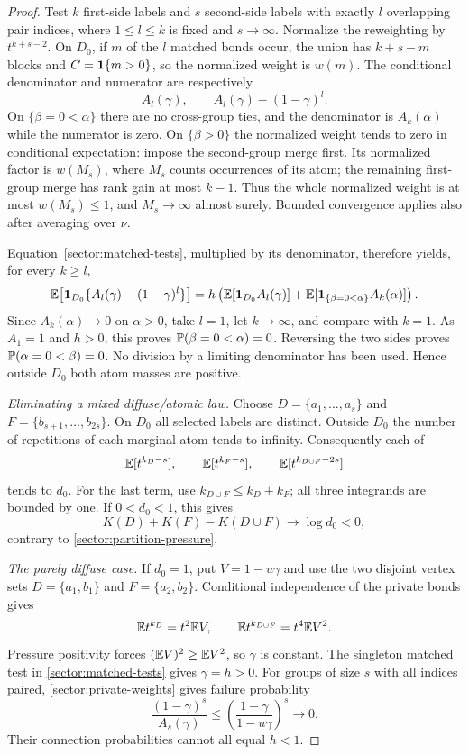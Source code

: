\begin{proof}
Test $k$ first-side labels and $s$ second-side labels with exactly
$l$ overlapping pair indices, where $1\leq l\leq k$ is fixed and
$s\to\infty$.  Normalize the reweighting by $t^{k+s-2}$.
On $D_0$, if $m$ of the $l$ matched bonds occur, the union has
$k+s-m$ blocks and $C=\mathbf 1\{m>0\}$, so the normalized weight is
$w(m)$.  The conditional denominator and numerator are respectively
\begin{equation}\label{sector:private-weights}
 A_l(\gamma),\qquad A_l(\gamma)-(1-\gamma)^l.
\end{equation}
On $\{\beta=0<\alpha\}$ there are no cross-group ties, and the
denominator is $A_k(\alpha)$ while the numerator is zero.
On $\{\beta>0\}$ the normalized weight tends to zero in conditional
expectation: impose the second-group merge first.  Its normalized
factor is $w(M_s)$, where $M_s$ counts occurrences of its atom; the
remaining first-group merge has rank gain at most $k-1$.
Thus the whole normalized weight is at most $w(M_s)\leq1$, and
$M_s\to\infty$ almost surely.  Bounded convergence applies also
after averaging over $\nu$.

Equation~\eqref{sector:matched-tests}, multiplied by its denominator,
therefore yields, for every $k\geq l$,
\begin{equation}\label{sector:half-atomic-equation}
 \mathbb E\bigl[\mathbf 1_{D_0}\{A_l(\gamma)-(1-\gamma)^l\}\bigr]
 =h\left(\mathbb E[\mathbf 1_{D_0}A_l(\gamma)]
          +\mathbb E[\mathbf 1_{\{\beta=0<\alpha\}}A_k(\alpha)]\right).
\end{equation}
Since $A_k(\alpha)\to0$ on $\alpha>0$, take $l=1$, let $k\to\infty$,
and compare with $k=1$.  As $A_1=1$ and $h>0$, this proves
$\mathbb P(\beta=0<\alpha)=0$.  Reversing the two sides proves
$\mathbb P(\alpha=0<\beta)=0$.  No division by a limiting denominator has
been used.  Hence outside $D_0$ both atom masses are positive.

\emph{Eliminating a mixed diffuse/atomic law.}
Choose $D=\{a_1,\ldots,a_s\}$ and
$F=\{b_{s+1},\ldots,b_{2s}\}$.  On $D_0$ all selected labels are
distinct.  Outside $D_0$ the number of repetitions of each marginal
atom tends to infinity.  Consequently each of
\[
 \mathbb E[t^{k_D-s}],\qquad \mathbb E[t^{k_F-s}],\qquad
 \mathbb E[t^{k_{D\cup F}-2s}]
\]
tends to $d_0$.  For the last term, use
$k_{D\cup F}\leq k_D+k_F$; all three integrands are bounded by one.
If $0<d_0<1$, this gives
\[
 K(D)+K(F)-K(D\cup F)\longrightarrow\log d_0<0,
\]
contrary to \eqref{sector:partition-pressure}.

\emph{The purely diffuse case.}
If $d_0=1$, put $V=1-u\gamma$ and use the two disjoint vertex sets
$D=\{a_1,b_1\}$ and $F=\{a_2,b_2\}$.  Conditional independence of
the private bonds gives
\[
 \mathbb E t^{k_D}=t^2\mathbb E V,\qquad
 \mathbb E t^{k_{D\cup F}}=t^4\mathbb E V^2.
\]
Pressure positivity forces $(\mathbb E V)^2\geq\mathbb E V^2$, so $\gamma$ is
constant.  The singleton matched test in
\eqref{sector:matched-tests} gives $\gamma=h>0$.  For groups of
size $s$ with all indices paired, \eqref{sector:private-weights}
gives failure probability
\[
 \frac{(1-\gamma)^s}{A_s(\gamma)}
 \leq\left(\frac{1-\gamma}{1-u\gamma}\right)^s\longrightarrow0.
\]
Their connection probabilities cannot all equal $h<1$.


\end{proof}
